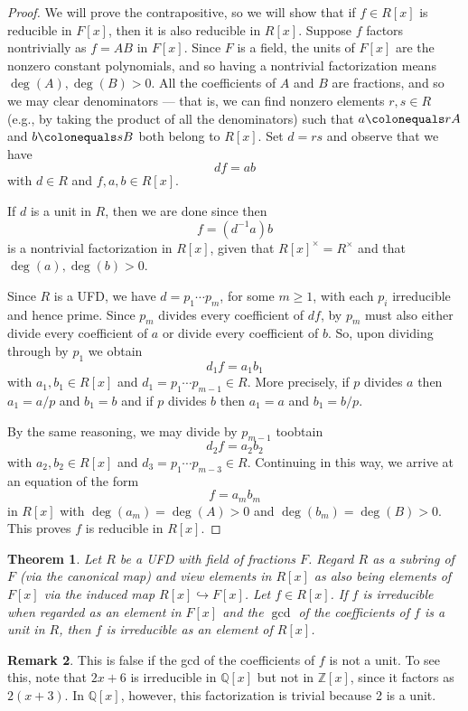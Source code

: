 \documentclass[12pt]{report}
\newtheorem{theorem}{Theorem}[chapter]
\numberwithin{equation}{section}
\numberwithin{theorem}{chapter}
\theoremstyle{definition}
\newtheorem*{basic properties}{Basic Properties}
\newtheorem*{Important Remark}{Important Remark}
\newtheorem{remark}[theorem]{Remark}
\begin{document}
\begin{proof}
We will prove the contrapositive, so we will show that if $f \in R[x]$ is reducible in $F[x]$, then it is also reducible in $R[x]$. Suppose $f$ factors nontrivially as $f = AB$ in $F[x]$.
Since $F$ is a field, the units of $F[x]$ are the nonzero constant polynomials, and so having a nontrivial factorization means $\deg(A), \deg(B) > 0$.
All the coefficients of $A$ and $B$ are fractions, and so we may clear denominators --- that is, we can find nonzero elements $r,s \in R$ (e.g., by taking the product of all the denominators) such that $a \colonequals r A$ and $b \colonequals s B$ both belong to $R[x]$.  Set $d = rs$ and observe that we have
$$d f = a b$$
with $d \in R$ and $f,a,b \in R[x]$. 
  

If $d$ is a unit in $R$, then we are done since then 
$$f = (d^{-1}a) b$$
is a nontrivial factorization in $R[x]$, given that $R[x]^\times = R^\times$ and that $\deg(a), \deg(b) > 0$.


Since $R$ is a UFD, we have $d = p_1 \cdots p_m$, for some $m \geqslant 1$, with each $p_i$ irreducible and hence prime.
Since $p_m$ divides every coefficient of $d f$, by  $p_m$ must also either divide every coefficient of $a$ or divide every coefficient of $b$.
So, upon dividing through by $p_1$ we obtain
$$d_1 f = a_1 b_1$$
with $a_1, b_1 \in R[x]$ and $d_1 = p_1 \cdots p_{m-1} \in R$. 
More precisely, if $p$ divides $a$ then $a_1 = a/p$ and $b_1 = b$ and if $p$ divides $b$ then $a_1 = a$ and $b_1 = b/p$.

By the same reasoning, we may divide by $p_{m-1}$ toobtain
$$d_2 f = a_2 b_2$$
with $a_2, b_2 \in R[x]$ and $d_3 = p_1 \cdots p_{m-3}  \in R$. 
Continuing in this way, we arrive at an equation of the form 
$$f = a_m b_m$$ 
in $R[x]$ with $\deg(a_m) = \deg(A) > 0$ and $\deg(b_m) = \deg(B) > 0$. This proves $f$ is reducible in $R[x]$. 
\end{proof}


\begin{theorem}
	Let $R$ be a UFD with field of fractions $F$. Regard $R$ as a subring of $F$ (via the canonical map) and view elements in $R[x]$ as also being elements of $F[x]$ via the induced map $R[x]\hookrightarrow F[x]$.
Let $f \in R[x]$. If $f$ is irreducible when regarded as an element   in $F[x]$ and the $\gcd$ of the coefficients of $f$ is a unit in $R$, then $f$ is  irreducible  as an element of $R[x]$.
\end{theorem}

\begin{remark}
This is false if the gcd of the coefficients of $f$ is not a unit. To see this, note that  $2x + 6$ is irreducible in $\mathbb{Q}[x]$ but not in $\mathbb{Z}[x]$, since it factors as $2(x+3)$. In $\mathbb{Q}[x]$, however, this factorization is trivial because 2 is a unit. 
\end{remark}
\end{document}

